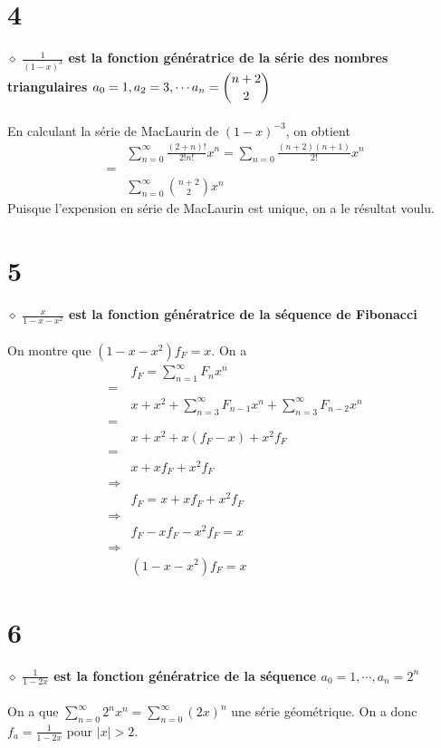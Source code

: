 \documentclass[a4paper,10pt]{article}
\begin{document}
\section*{4}
$\diamond$ \textbf{$\frac{1}{(1-x)^3}$ est la fonction génératrice de la série des nombres triangulaires $a_0 = 1, a_2 = 3, \cdots a_n = \dbinom{n+2}{2}$}
\\
\\
En calculant la série de MacLaurin de $(1-x)^{-3}$, on obtient
\begin{align*}
	& \sum_{n=0}^\infty \frac{(2+n)!}{2!n!} x^n = \sum_{n=0} \frac{(n+2)(n+1)}{2!}x^n \\
	= \\
	& \sum_{n=0}^\infty \binom{n+2}{2} x^n
\end{align*}
Puisque l'expension en série de MacLaurin est unique, on a le résultat voulu.

\section*{5}
$\diamond$ \textbf{$\frac{x}{1-x-x^2}$ est la fonction génératrice de la séquence de Fibonacci}
\\
\\
On montre que $(1-x-x^2)f_F = x$. On a 
\begin{align*}
	& f_F = \sum_{n=1}^\infty F_n x^n \\
	= \\
	& x + x^2 + \sum_{n=3}^\infty F_{n-1}x^n + \sum_{n=3}^\infty F_{n-2}x^n \\
	= \\
	& x + x^2 + x(f_F - x) + x^2 f_F \\
	= \\
	& x + xf_F + x^2 f_F \\
	\Rightarrow \\
	& f_F = x + xf_F + x^2f_F \\
	\Rightarrow \\
	& f_F - xf_F - x^2f_F = x \\
	\Rightarrow \\
	& (1-x-x^2)f_F = x
\end{align*} 

\section*{6}
$\diamond$ \textbf{$\frac{1}{1-2x}$ est la fonction génératrice de la séquence $a_0 = 1, \cdots, a_n = 2^n$}
\\
\\
On a que $\displaystyle\sum_{n=0}^\infty 2^n x^n = \displaystyle\sum_{n=0}^\infty (2x)^n$ une série géométrique. On a donc $f_a = \frac{1}{1-2x}$ pour $|x| > 2$.
\end{document}
